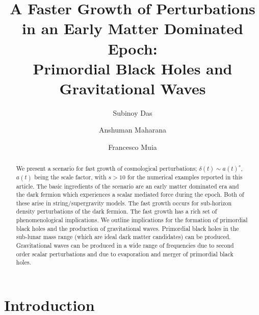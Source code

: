 \documentclass[a4paper, amsfonts, amssymb, amsmath, reprint, showkeys, nofootinbib, twoside, superscriptaddress]{revtex4-1}
\begin{document}
\title{A Faster Growth of Perturbations in an Early Matter Dominated Epoch: \\  Primordial Black Holes  and Gravitational Waves}


\author{Subinoy Das}
 \author{Anshuman Maharana}
  \author{Francesco Muia}


\begin{abstract}

We present a scenario for fast growth of cosmological perturbations;  $\delta(t) \sim a(t)^s$, $a(t)$ being the scale factor, with $s > 10$ for the numerical examples reported in this article. The basic ingredients of the scenario are an early matter dominated era and the dark fermion which experiences a scalar mediated force during the epoch. Both of these arise in string/supergravity models. The fast growth occurs for sub-horizon density perturbations of the dark fermion. The fast growth has a rich set of phenomenological implications. We outline implications for the formation of primordial black holes and the production of gravitational waves. Primordial black holes in the sub-lunar mass range (which are ideal dark matter candidates) can be produced. Gravitational waves can be produced in a wide range of frequencies due to second order scalar perturbations and due to evaporation and merger of primordial black holes.



\end{abstract}



\maketitle

\tableofcontents

\setcounter{footnote}{0}

\section{Introduction}
\end{document}
